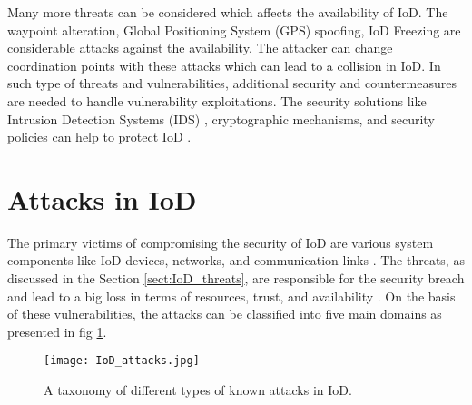 \documentclass{easychair}
\begin{document}
Many more threats can be considered which affects the availability of IoD. The waypoint alteration, Global Positioning System (GPS) spoofing, IoD Freezing are considerable attacks against the availability. The attacker can change coordination points with these attacks which can lead to a collision in IoD. In such type of threats and vulnerabilities, additional security and countermeasures are needed to handle vulnerability exploitations. The security solutions like Intrusion Detection Systems (IDS) \cite{liu2011research}, cryptographic mechanisms, and security policies can help to protect IoD \cite{sharma2018three}.

\section{Attacks in IoD}
\label{sect:IoD_Attacks}
The primary victims of compromising the security of IoD are various system components like IoD devices, networks, and communication links \cite{yampolskiy2013taxonomy}. The threats, as discussed in the Section \ref{sect:IoD_threats}, are responsible for the security breach and lead to a big loss in terms of resources, trust, and availability \cite{javaid2012cyber} \cite{mansfield2013unmanned}. On the basis of these vulnerabilities, the attacks can be classified into five main domains as presented in fig \ref{IoD_sc}.

\begin{figure}[ht!]
\centering
\texttt{[image: IoD\_attacks.jpg]}
\caption{A taxonomy of different types of known attacks in IoD.}
\label{IoD_sc}
\end{figure}
\end{document}
